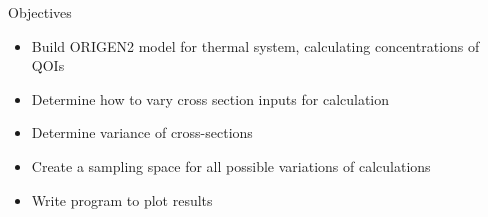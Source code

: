\documentclass{beamer}
\newcommand{\cmark}{\ding{51}}%
\newcommand{\done}{\rlap{$\square$}{\raisebox{2pt}{\large\hspace{1pt}\cmark}}%
  \hspace{-2.5pt}}
\newcommand{\ndone}{\rlap{$\square$}{\raisebox{2pt}{}}%
  \hspace{8pt}}
\begin{document}
\begin{frame}
\begin{block}{Objectives}
  \begin{itemize}
  \item[\done]{Build ORIGEN2 model for thermal system, calculating
  concentrations of QOIs}
  \item[\ndone]{Determine how to vary cross section inputs for calculation}
  \item[\ndone]{Determine variance of cross-sections}
  \item[\ndone]{Create a sampling space for all possible variations of
    calculations}
  \item[\ndone]{Write program to plot results}
  \end{itemize}
\end{block}
\end{frame}
\end{document}
